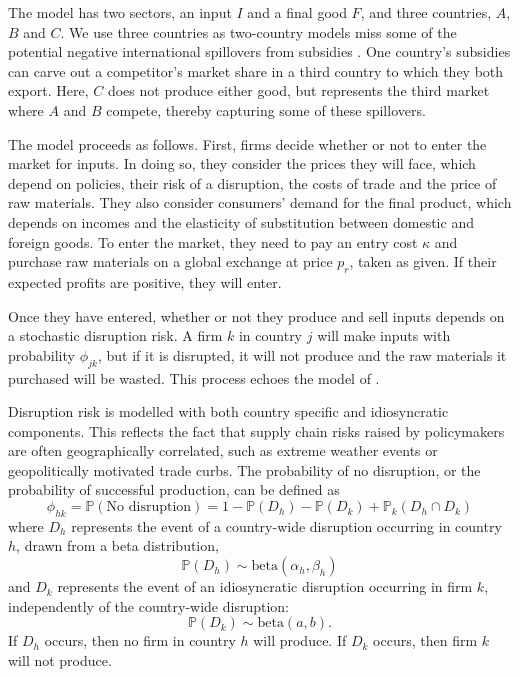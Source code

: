 \documentclass{article}
\begin{document}
The model has two sectors, an input $I$ and a final good $F$, and three countries, $A$, $B$ and $C$. We use three countries as two-country models miss some of the potential negative international spillovers from subsidies \parencite{bown_wtoing_2019}. One country's subsidies can carve out a competitor's market share in a third country to which they both export. Here, $C$ does not produce either good, but represents the third market where $A$ and $B$ compete, thereby capturing some of these spillovers. 

The model proceeds as follows. First, firms decide whether or not to enter the market for inputs. In doing so, they consider the prices they will face, which depend on policies, their risk of a disruption, the costs of trade and the price of raw materials. They also consider consumers' demand for the final product, which depends on incomes and the elasticity of substitution between domestic and foreign goods. To enter the market, they need to pay an entry cost $\kappa$ and purchase raw materials on a global exchange at price $p_r$, taken as given. If their expected profits are positive, they will enter.

Once they have entered, whether or not they produce and sell inputs depends on a stochastic disruption risk. A firm $k$ in country $j$ will make inputs with probability $\phi_{jk}$, but if it is disrupted, it will not produce and the raw materials it purchased will be wasted. This process echoes the model of \textcite{bimpikis_supply_2019}.

Disruption risk is modelled with both country specific and idiosyncratic components. This reflects the fact that supply chain risks raised by policymakers are often geographically correlated, such as extreme weather events or geopolitically motivated trade curbs. The probability of no disruption, or the probability of successful production, can be defined as
\begin{equation}\label{eq:phi}
    \phi_{hk} = \mathbb{P}(\text{No disruption}) = 1 - \mathbb{P}(D_{h}) - \mathbb{P}(D_{k})  + \mathbb{P}_{k}(D_{h} \cap D_{k})
\end{equation} 
where $D_h$ represents the event of a country-wide disruption occurring in country $h$, drawn from a beta distribution,
\begin{equation}\label{eq:pdj}
    \mathbb{P}(D_{h}) \sim \text{beta}(\alpha_h, \beta_h)
\end{equation}
and $D_k$ represents the event of an idiosyncratic disruption occurring in firm $k$, independently of the country-wide disruption:
\begin{equation}\label{eq:pdk}
    \mathbb{P}(D_{k}) \sim \text{beta}(a, b).
\end{equation}
If $D_h$ occurs, then no firm in country $h$ will produce. If $D_k$ occurs, then firm $k$ will not produce.
\end{document}
